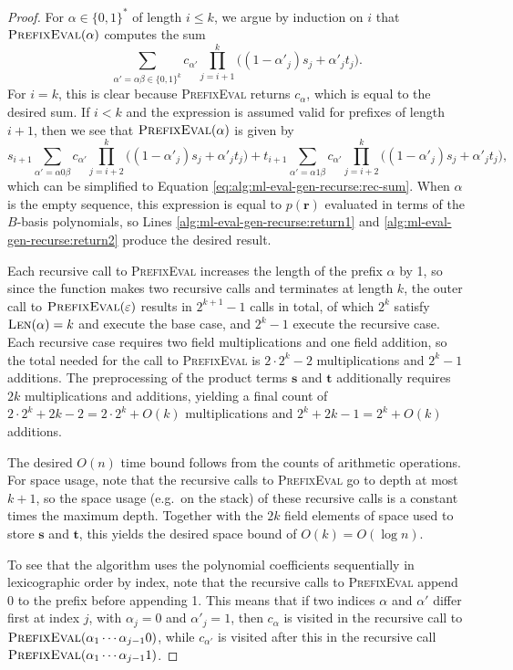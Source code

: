 \documentclass[12pt]{article}
\theoremstyle{plain}
\theoremstyle{definition}
\newcommand*{\fn}[1]{\textsc{{#1}}}
\renewcommand*{\vec}[1]{{\mathbf{#1}}}
\newcommand*{\emptySeq}{{\varepsilon}}
\begin{document}
\begin{proof}
  For $\alpha \in \{0, 1\}^*$ of length $i \leq k$, we argue by induction on $i$ that $\fn{PrefixEval}(\alpha)$ computes the sum
  \begin{equation}
    \label{eq:alg:ml-eval-gen-recurse:rec-sum}
    \sum_{\alpha' = \alpha \beta \in \{0, 1\}^k} c_{\alpha'} \prod_{j=i+1}^k \big( (1 - \alpha'_j) s_j + \alpha'_j t_j \big).
  \end{equation}
  For $i = k$, this is clear because \fn{PrefixEval} returns $c_\alpha$, which is equal to the desired sum.  If $i < k$ and the expression is assumed valid for prefixes of length $i + 1$, then we see that $\fn{PrefixEval}(\alpha)$ is given by
  \[
    s_{i+1} \sum_{\alpha' = \alpha 0 \beta} c_{\alpha'} \prod_{j=i+2}^k \big( (1 - \alpha'_j) s_j + \alpha'_j t_j \big) +
    t_{i+1} \sum_{\alpha' = \alpha 1 \beta} c_{\alpha'} \prod_{j=i+2}^k \big( (1 - \alpha'_j) s_j + \alpha'_j t_j \big),
  \]
  which can be simplified to Equation \ref{eq:alg:ml-eval-gen-recurse:rec-sum}.  When $\alpha$ is the empty sequence, this expression is equal to $p(\vec{r})$ evaluated in terms of the $B$-basis polynomials, so Lines \ref{alg:ml-eval-gen-recurse:return1} and \ref{alg:ml-eval-gen-recurse:return2} produce the desired result.

  Each recursive call to \fn{PrefixEval} increases the length of the prefix $\alpha$ by 1, so since the function makes two recursive calls and terminates at length $k$, the outer call to $\fn{PrefixEval}(\emptySeq)$ results in $2^{k+1} - 1$ calls in total, of which $2^k$ satisfy $\fn{Len}(\alpha) = k$ and execute the base case, and $2^k - 1$ execute the recursive case.  Each recursive case requires two field multiplications and one field addition, so the total needed for the call to \fn{PrefixEval} is $2 \cdot 2^k - 2$ multiplications and $2^k - 1$ additions.  The preprocessing of the product terms $\vec{s}$ and $\vec{t}$ additionally requires $2k$ multiplications and additions, yielding a final count of $2 \cdot 2^k + 2k - 2 = 2 \cdot 2^k + O(k)$ multiplications and $2^k + 2k - 1 = 2^k + O(k)$ additions.

  The desired $O(n)$ time bound follows from the counts of arithmetic operations.  For space usage, note that the recursive calls to \fn{PrefixEval} go to depth at most $k+1$, so the space usage (e.g.\ on the stack) of these recursive calls is a constant times the maximum depth.  Together with the $2k$ field elements of space used to store $\vec{s}$ and $\vec{t}$, this yields the desired space bound of $O(k) = O(\log n)$.

  To see that the algorithm uses the polynomial coefficients sequentially in lexicographic order by index, note that the recursive calls to \fn{PrefixEval} append 0 to the prefix before appending 1.  This means that if two indices $\alpha$ and $\alpha'$ differ first at index $j$, with $\alpha_j = 0$ and $\alpha'_j = 1$, then $c_\alpha$ is visited in the recursive call to $\fn{PrefixEval}(\alpha_1 \cdots \alpha_{j-1} 0)$, while $c_{\alpha'}$ is visited after this in the recursive call $\fn{PrefixEval}(\alpha_1 \cdots \alpha_{j-1} 1)$.
\end{proof}
\end{document}
